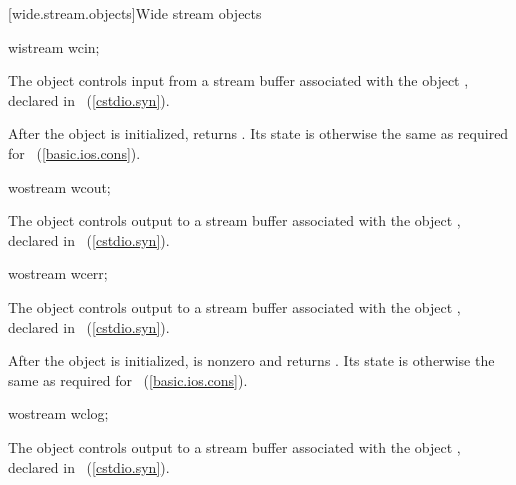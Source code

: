[wide.stream.objects]{Wide stream objects}

%
\begin{itemdecl}
wistream wcin;
\end{itemdecl}

\begin{itemdescr}
\pnum
The object
controls input from a stream buffer
associated with the object
,
declared in
%
~(\ref{cstdio.syn}).

\pnum
After the object
is initialized,
returns
.
Its state is otherwise the same as required for
~(\ref{basic.ios.cons}).
\end{itemdescr}

%
\begin{itemdecl}
wostream wcout;
\end{itemdecl}

\begin{itemdescr}
\pnum
The object
controls output to a stream buffer
associated with the object
,
declared in
%
~(\ref{cstdio.syn}).
\end{itemdescr}

%
\begin{itemdecl}
wostream wcerr;
\end{itemdecl}

\begin{itemdescr}
\pnum
The object
controls output to a stream buffer
associated with the object
,
declared in
%
~(\ref{cstdio.syn}).

\pnum
After the object
is initialized,
is nonzero and  returns .
Its state is otherwise the same as required for
~(\ref{basic.ios.cons}).
\end{itemdescr}

%
\begin{itemdecl}
wostream wclog;
\end{itemdecl}

\begin{itemdescr}
\pnum
The object
controls output to a stream buffer
associated with the object
,
declared in
%
~(\ref{cstdio.syn}).
\end{itemdescr}

